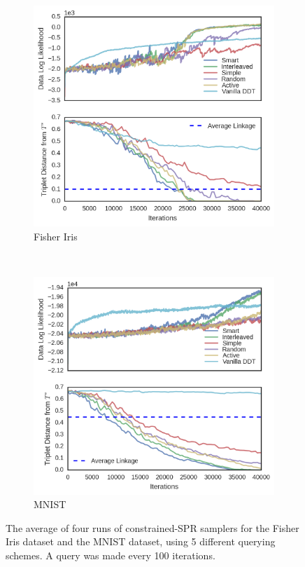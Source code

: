 \begin{figure}
    \centering
    \begin{subfigure}[]{0.6\textwidth}
        \centering
        \includegraphics[width=\textwidth]{img/ibhc/Fisher-Iris-result.png} \caption{Fisher Iris}
        \label{fig:iris-result}
    \end{subfigure}
    \\
    \begin{subfigure}[]{0.6\textwidth}
        \centering
        \includegraphics[width=\textwidth]{img/ibhc/MNIST-result.png}
        \caption{MNIST}
        \label{fig:mnist-result}
    \end{subfigure}
    \caption{The average of four runs of constrained-SPR samplers
    for the Fisher Iris dataset and the MNIST dataset, using 5 different querying schemes. A query was made every 100 iterations.}
    \label{fig:main-results}
\end{figure}

